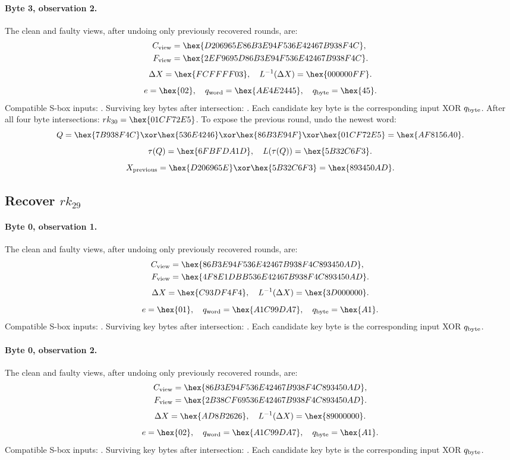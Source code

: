 \paragraph{Byte 3, observation 2.}
The clean and faulty views, after undoing only previously recovered rounds, are:
\[\begin{aligned}C_{\rm view}&=\hex{D206965E86B3E94F536E42467B938F4C},\\F_{\rm view}&=\hex{2EF9695D86B3E94F536E42467B938F4C}.\end{aligned}\]
\[\Delta X=\hex{FCFFFF03},\quad L^{-1}(\Delta X)=\hex{000000FF}.\]
\[e=\hex{02},\quad q_{\rm word}=\hex{AE4E2445},\quad q_{\rm byte}=\hex{45}.\]
Compatible S-box inputs: . Surviving key bytes after intersection: . Each candidate key byte is the corresponding input XOR $q_{\rm byte}$.
After all four byte intersections: $rk_{30}=\hex{01CF72E5}$.
To expose the previous round, undo the newest word:
\[Q=\hex{7B938F4C}\xor\hex{536E4246}\xor\hex{86B3E94F}\xor\hex{01CF72E5}=\hex{AF8156A0}.\]
\[\tau(Q)=\hex{6FBFDA1D},\quad L(\tau(Q))=\hex{5B32C6F3}.\]
\[X_{\rm previous}=\hex{D206965E}\xor\hex{5B32C6F3}=\hex{893450AD}.\]
\subsection*{Recover $rk_{29}$}
\paragraph{Byte 0, observation 1.}
The clean and faulty views, after undoing only previously recovered rounds, are:
\[\begin{aligned}C_{\rm view}&=\hex{86B3E94F536E42467B938F4C893450AD},\\F_{\rm view}&=\hex{4F8E1DBB536E42467B938F4C893450AD}.\end{aligned}\]
\[\Delta X=\hex{C93DF4F4},\quad L^{-1}(\Delta X)=\hex{3D000000}.\]
\[e=\hex{01},\quad q_{\rm word}=\hex{A1C99DA7},\quad q_{\rm byte}=\hex{A1}.\]
Compatible S-box inputs: . Surviving key bytes after intersection: . Each candidate key byte is the corresponding input XOR $q_{\rm byte}$.
\paragraph{Byte 0, observation 2.}
The clean and faulty views, after undoing only previously recovered rounds, are:
\[\begin{aligned}C_{\rm view}&=\hex{86B3E94F536E42467B938F4C893450AD},\\F_{\rm view}&=\hex{2B38CF69536E42467B938F4C893450AD}.\end{aligned}\]
\[\Delta X=\hex{AD8B2626},\quad L^{-1}(\Delta X)=\hex{89000000}.\]
\[e=\hex{02},\quad q_{\rm word}=\hex{A1C99DA7},\quad q_{\rm byte}=\hex{A1}.\]
Compatible S-box inputs: . Surviving key bytes after intersection: . Each candidate key byte is the corresponding input XOR $q_{\rm byte}$.
